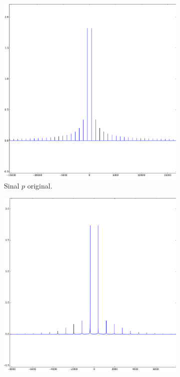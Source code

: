 \begin{figure}[ht] 
    \begin{subfigure}[b]{0.5\linewidth}
        \centering
        \includegraphics[width=1\linewidth]{prints/p_normal.png}
        \caption{Sinal \(p\) original.} 
        \label{fig:p_normal} 
    \end{subfigure}%
    \begin{subfigure}[b]{0.5\linewidth}
        \centering
        \includegraphics[width=1\linewidth]{prints/p_atenuado.png} 

\end{subfigure}
\end{figure}
